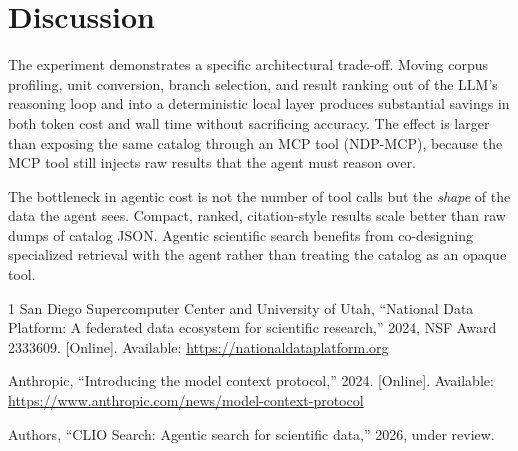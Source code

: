 \documentclass[conference]{IEEEtran}
\begin{document}
\section{Discussion}

The experiment demonstrates a specific architectural trade-off. Moving
corpus profiling, unit conversion, branch selection, and result ranking
out of the LLM's reasoning loop and into a deterministic local layer
produces substantial savings in both token cost and wall time without
sacrificing accuracy. The effect is larger than exposing the same catalog
through an MCP tool (NDP-MCP), because the MCP tool still injects raw
results that the agent must reason over.

The bottleneck in agentic cost is not the number of tool calls but the
\emph{shape} of the data the agent sees. Compact, ranked, citation-style
results scale better than raw dumps of catalog JSON. Agentic scientific
search benefits from co-designing specialized retrieval with the agent
rather than treating the catalog as an opaque tool.

\begin{thebibliography}{1}
San Diego Supercomputer Center and University of Utah, ``National Data
Platform: A federated data ecosystem for scientific research,'' 2024, NSF
Award 2333609. [Online]. Available:
\url{https://nationaldataplatform.org}

Anthropic, ``Introducing the model context protocol,'' 2024. [Online].
Available:
\url{https://www.anthropic.com/news/model-context-protocol}

Authors, ``CLIO Search: Agentic search for scientific data,'' 2026, under
review.
\end{thebibliography}
\end{document}
